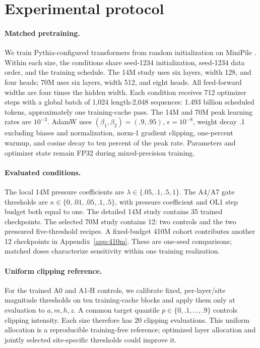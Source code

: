 \section{Experimental protocol}
\label{sec:experiments}
\paragraph{Matched pretraining.}
We train Pythia-configured transformers \citep{biderman2023pythia} from random
initialization on MiniPile \citep{kaddour2023minipile}.
Within each size, the conditions share seed-1234 initialization, seed-1234
data order, and the training schedule. The 14M study uses six layers,
width 128, and four heads; 70M uses six layers, width 512, and eight heads.
All feed-forward widths are four times the hidden width.
Each condition receives 712 optimizer steps with a global batch of 1,024
length-2,048 sequences: 1.493 billion scheduled tokens, approximately one
training-cache pass. The 14M and 70M peak learning rates are $10^{-3}$.
AdamW uses $(\beta_1,\beta_2)=(.9,.95)$, $\epsilon=10^{-8}$,
weight decay .1 excluding biases and normalization, norm-1 gradient clipping,
one-percent warmup, and cosine decay to ten percent of the peak rate.
Parameters and optimizer state remain FP32 during mixed-precision training.

\paragraph{Evaluated conditions.}
The local 14M pressure coefficients are
$\lambda\in\{.05,.1,.5,1\}$. The A4/A7 gate thresholds are
$\kappa\in\{0,.01,.05,.1,.5\}$, with pressure coefficient and OL1 step budget
both equal to one. The detailed 14M study contains 35 trained checkpoints.
The selected 70M study contains 12: two controls and the two pressured
five-threshold recipes. A fixed-budget 410M cohort contributes another 12
checkpoints in Appendix~\ref{app:410m}. These are one-seed comparisons;
matched doses characterize sensitivity within one training realization.

\paragraph{Uniform clipping reference.}
For the trained A0 and A1-H controls, we calibrate fixed, per-layer/site
magnitude thresholds on ten training-cache blocks and apply them only at
evaluation to $a,m,h,z$. A common target quantile
$p\in\{0,.1,\ldots,.9\}$ controls clipping intensity. Each size therefore has
20 clipping evaluations. This uniform allocation is a reproducible
training-free reference; optimized layer allocation and jointly selected
site-specific thresholds could improve it.

